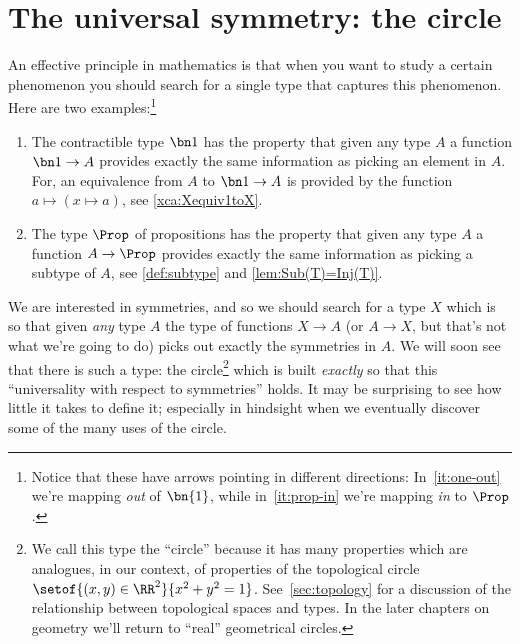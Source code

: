 \chapter{The universal symmetry: the circle}
\label{cha:circle}

An effective principle in mathematics is that when you want to study a certain
phenomenon you should search for a single type that captures this phenomenon.
Here are two examples:\footnote{%
  Notice that these have arrows pointing in different directions:
  In~\ref{it:one-out} we're mapping \emph{out} of $\bn{1}$,
  while in~\ref{it:prop-in} we're mapping \emph{in} to $\Prop$.}
\begin{enumerate}
\item\label{it:one-out}
  The contractible type $\bn 1$ has the property that given
any type $A$ a function $\bn 1\to A$ provides exactly the
same information as picking an element in $A$.
For, an equivalence from $A$ to $\bn 1\to A$ is provided by
the function $a \mapsto (x \mapsto a)$, see \cref{xca:Xequiv1toX}.
\item\label{it:prop-in}
  The type $\Prop$ of propositions has the property that
given any type $A$ a function $A\to\Prop$ provides exactly
the same information as picking a subtype of $A$,
see \cref{def:subtype} and \cref{lem:Sub(T)=Inj(T)}.
\end{enumerate}
We are interested in symmetries, and so we should search for a type $X$
which is so that given \emph{any} type $A$ the type of functions
$X\to A$ (or $A\to X$, but that's not what we're going to do)
picks out exactly the symmetries in $A$.
We will soon see that there is such a type:
the circle\footnote{%
  We call this type the ``circle''
  because it has many properties which are analogues, in our context, of properties of
  the topological circle $\setof{(x,y)\in\RR^2}{x^2+y^2=1}$.
  See~\cref{sec:topology} for a discussion of the relationship
  between topological spaces and types.
  In the later chapters on geometry we'll return
  to ``real'' geometrical circles.}
which is built \emph{exactly} so that this
``universality with respect to symmetries'' holds.
It may be surprising to see how little it takes to define it;
especially in hindsight when we eventually discover some of the many uses of the circle.

